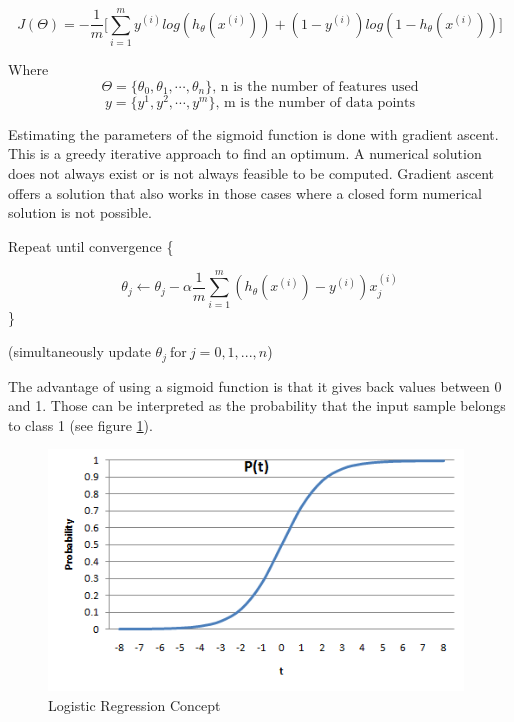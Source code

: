 \documentclass[12pt, a4paper, onecolumn, oneside, parskip=half]{scrartcl}
\begin{document}
\begin{equation}
\label{eq:cost_function_log_reg}
 J(\Theta)= -\frac{1}{m} \lbrack \sum_{i=1}^{m} y^{(i)} log(h_\theta(x^{(i)})) + (1-y^{(i)})log(1-h_\theta(x^{(i)})) \rbrack
\end{equation}

Where $$\Theta = \{\theta_0, \theta_1, \cdots, \theta_n\}\text{, n is the number of features used}$$
$$y = \{y^1, y^2, \cdots, y^m\}\text{, m is the number of data points}$$

Estimating the parameters of the sigmoid function is done with gradient ascent. This is a greedy iterative approach to find an optimum. A numerical solution does not always exist or is not always feasible to be computed. Gradient ascent offers a solution that also works in those cases where a closed form numerical solution is not possible.\newline

Repeat until convergence \{

\begin{equation} 
\label{eq:Gradient_descent_log_reg}
\theta_j \leftarrow \theta_j - \alpha\frac{1}{m}\sum_{i=1}^{m}(h_\theta(x^{(i)}) - y^{(i)}) x_j^{(i)}
\end{equation}
\}

(simultaneously update $\theta_{j} \ \text{for} \ j=0,1,...,n$)

The advantage of using a sigmoid function is that it gives back values between 0 and 1. Those can be interpreted as the probability that the input sample belongs to class 1 (see figure \ref{logistic_regression_concept}). 

\begin{figure}[ht!]
  \centering
  \includegraphics[width=110mm]{pictures/logistic_regression_concept.png}
  \caption{Logistic Regression Concept \label{logistic_regression_concept}}
\end{figure}
\end{document}
